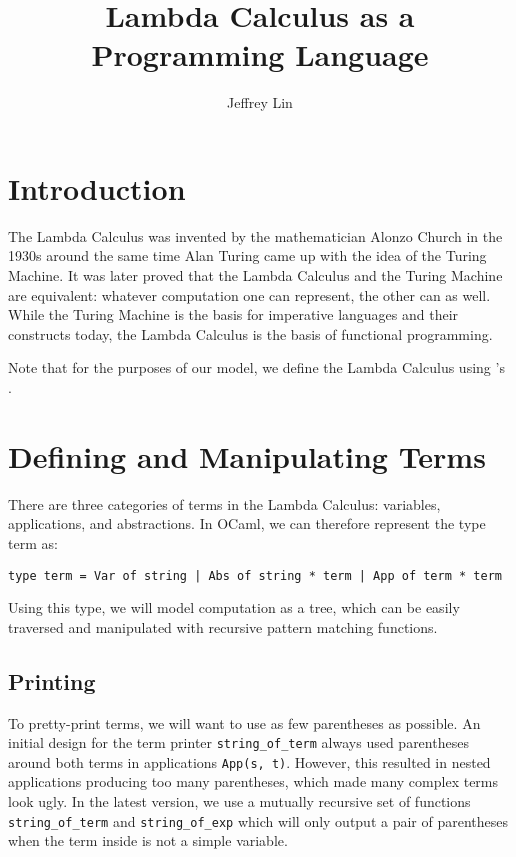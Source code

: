 \documentclass[12pt,letterpaper]{article}
\title{Lambda Calculus as a Programming Language}
\author{Jeffrey Lin}
\begin{document}
\maketitle

\section{Introduction}
The Lambda Calculus was invented by the mathematician Alonzo Church in the 1930s around the same time Alan Turing came up with the idea of the Turing Machine.
It was later proved that the Lambda Calculus and the Turing Machine are equivalent: whatever computation one can represent, the other can as well.
While the Turing Machine is the basis for imperative languages and their constructs today, the Lambda Calculus is the basis of functional programming.

Note that for the purposes of our model, we define the Lambda Calculus using \citeauthor{Harrison_1997}'s .

\section{Defining and Manipulating Terms}

There are three categories of terms in the Lambda Calculus: variables, applications, and abstractions.
In OCaml, we can therefore represent the type term as:
\begin{verbatim}
type term = Var of string | Abs of string * term | App of term * term
\end{verbatim}
Using this type, we will model computation as a tree, which can be easily traversed and manipulated with recursive pattern matching functions.

\subsection{Printing}

To pretty-print terms, we will want to use as few parentheses as possible.
An initial design for the term printer \texttt{string_of_term} always used parentheses around both terms in applications \texttt{App(s, t)}.
However, this resulted in nested applications producing too many parentheses, which made many complex terms look ugly.
In the latest version, we use a mutually recursive set of functions \texttt{string_of_term} and \texttt{string_of_exp} which will only output a pair of parentheses when the term inside is not a simple variable.
\end{document}
